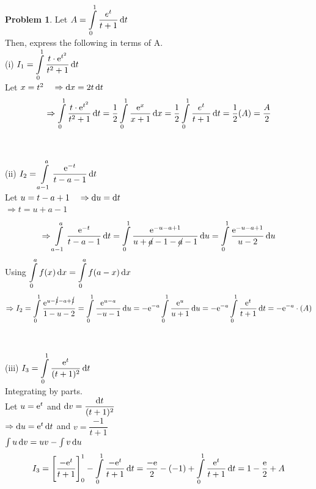 \documentclass[14]{article}
\theoremstyle{definition}
\newtheorem{prob}{Problem}
\theoremstyle{case}
\begin{document}
\begin{prob}
Let $A = \displaystyle\int\limits_0^1 \dfrac{e^t}{t + 1} \dif t$\\
Then, express the following in terms of A.\\
(i) $I_1 = \displaystyle\int\limits_0^1 \dfrac{t\cdot {\rm e}^{t^2}}{t^2 + 1} \dif t$\\
Let $x = t^2 \quad \Rightarrow \dif x = 2t \dif t$\\
\[\Rightarrow \displaystyle\int\limits_0^1 \dfrac{t\cdot {\rm e}^{t^2}}{t^2 + 1} \dif t = \dfrac12 \int\limits_0^1 \dfrac{{\rm e}^x}{x + 1} \dif x = \dfrac12 \int\limits_0^1 \dfrac{e^t}{t + 1} \dif t = \dfrac12 (A) = \dfrac{A}2\]\\\\
(ii) $I_2 = \displaystyle\int\limits_{a-1}^a \dfrac{{\rm e}^{-t}}{t-a-1} \dif t$\\
Let $u = t - a + 1 \quad \Rightarrow \dif u = \dif t$\\
$\Rightarrow t = u + a - 1$
\[\Rightarrow \int\limits_{a-1}^a \dfrac{{\rm e}^{-t}}{t-a-1} \dif t = \int\limits_0^1 \dfrac{{\rm e}^{-u-a+1}}{u+\cancel{a}-1-\cancel{a}-1} \dif u = \int\limits_0^1 \dfrac{{\rm e}^{-u-a+1}}{u-2} \dif u \]
Using $\displaystyle \int\limits_0^a f(x) \dif x = \int\limits_0^a f(a-x) \dif x$
\[\Rightarrow I_2 = \int\limits_0^1 \dfrac{{\rm e}^{u-\cancel{1}-a+\cancel{1}}}{1-u-2} = \int\limits_0^1 \dfrac{{\rm e}^{u-a}}{-u-1} \dif u = -{\rm e}^{-a} \int\limits_0^1 \dfrac{{\rm e}^{u}}{u + 1} \dif u= -{\rm e}^{-a} \int\limits_0^1 \dfrac{{\rm e}^{t}}{t + 1} \dif t = -{\rm e}^{-a} \cdot (A)\]\\\\
(iii) $I_3 = \displaystyle \int\limits_0^1 \dfrac{{\rm e}^t}{(t+1)^2} \dif t$\\
Integrating by parts.\\
Let $u = {\rm e}^t$ and $\dif v = \dfrac{\dif t}{(t+1)^2}$\\
$\Rightarrow \dif u = {\rm e}^t \dif t$ and $v = \dfrac{-1}{t+1}$\\
$\int u \dif v = uv - \int v \dif u$
\[I_3 = \left[\dfrac{-{\rm e}^t}{t+1}\right]_0^1 - \int\limits_0^1 \dfrac{-{\rm e}^t}{t+1} \dif t = \dfrac{- {\rm e}}{2}  - (-1)  + \int\limits_0^1 \dfrac{{\rm e}^t}{t+1} \dif t = 1 - \dfrac{\rm e}{2} + A\]
\end{prob}
\pagebreak
\end{document}
